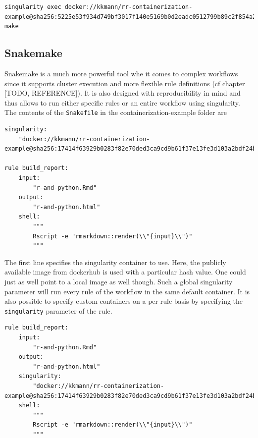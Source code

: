 \documentclass[]{book}
\begin{document}
\begin{verbatim}
singularity exec docker://kkmann/rr-containerization-example@sha256:5225e53f934d749bf3017f140e5169b0d2eadc0512799b89c2f854a2d002d0c4 make
\end{verbatim}

\subsection{Snakemake}\label{snakemake}

Snakemake is a much more powerful tool whe it comes to complex workflows
since it supports cluster execution and more flexible rule definitions
(cf chapter {[}TODO, REFERENCE{]}). It is also designed with
reproducibility in mind and thus allows to run either specific rules or
an entire workflow using singularity. The contents of the
\texttt{Snakefile} in the containerization-example folder are

\begin{verbatim}
singularity:
    "docker://kkmann/rr-containerization-example@sha256:17414f63929b0283f82e70ded3ca9cd9b61f37e13fe3d103a2bdf24b9056114e"

rule build_report:
    input:
        "r-and-python.Rmd"
    output:
        "r-and-python.html"
    shell:
        """
        Rscript -e "rmarkdown::render(\\"{input}\\")"
        """
\end{verbatim}

The first line specifies the singularity container to use. Here, the
publicly available image from dockerhub is used with a particular hash
value. One could just as well point to a local image as well though.
Such a global singularity parameter will run every rule of the workflow
in the same default container. It is also possible to specify custom
containers on a per-rule basis by specifying the \texttt{singularity}
parameter of the rule.

\begin{verbatim}
rule build_report:
    input:
        "r-and-python.Rmd"
    output:
        "r-and-python.html"
    singularity:
        "docker://kkmann/rr-containerization-example@sha256:17414f63929b0283f82e70ded3ca9cd9b61f37e13fe3d103a2bdf24b9056114e"
    shell:
        """
        Rscript -e "rmarkdown::render(\\"{input}\\")"
        """
\end{verbatim}
\end{document}

